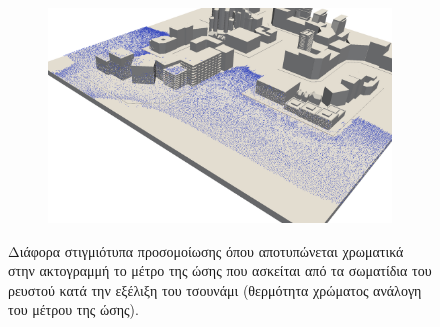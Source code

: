 \begin{figure}
\begin{subfigure}{.5\textwidth}
  \end{subfigure}
  \begin{subfigure}{.5\textwidth}
    \centering
    \includegraphics[width=\textwidth]{figures/impulses-3.png}
  \end{subfigure}
  \caption[Ώσεις στην ακτογραμμή]{Διάφορα στιγμιότυπα προσομοίωσης όπου αποτυπώνεται
    χρωματικά στην ακτογραμμή το μέτρο της ώσης που ασκείται από τα σωματίδια του ρευστού
    κατά την εξέλιξη του τσουνάμι (θερμότητα χρώματος ανάλογη του μέτρου της ώσης).}
  \label{fig:impulses}
\end{figure}

